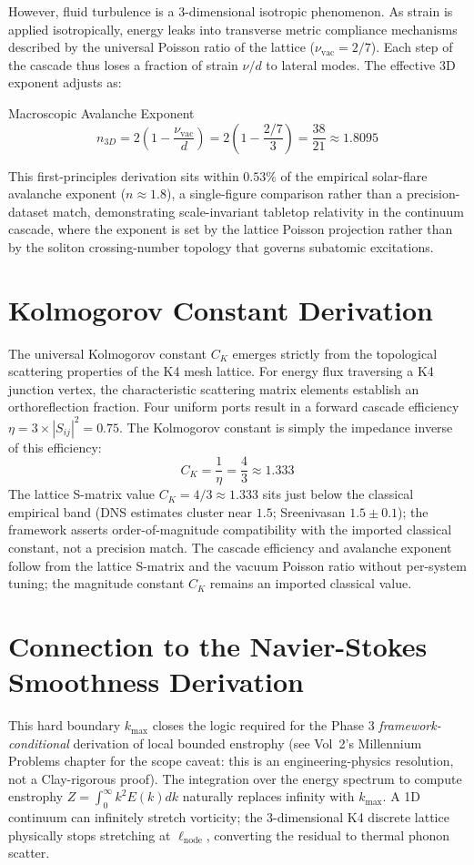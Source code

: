 However, fluid turbulence is a 3-dimensional isotropic phenomenon. As strain is applied isotropically, energy leaks into transverse metric compliance mechanisms described by the universal Poisson ratio of the lattice ($\nu_{\mathrm{vac}} = 2/7$). Each step of the cascade thus loses a fraction of strain $\nu/d$ to lateral modes. The effective 3D exponent adjusts as:
\begin{resultbox}{Macroscopic Avalanche Exponent}
\begin{equation}
    n_{3D} = 2 \left(1 - \frac{\nu_{\mathrm{vac}}}{d}\right) = 2\left(1 - \frac{2/7}{3}\right) = \frac{38}{21} \approx 1.8095
\end{equation}
\end{resultbox}
This first-principles derivation sits within $0.53\%$ of the empirical solar-flare avalanche exponent ($n \approx 1.8$), a single-figure comparison rather than a precision-dataset match, demonstrating scale-invariant tabletop relativity in the continuum cascade, where the exponent is set by the lattice Poisson projection rather than by the soliton crossing-number topology that governs subatomic excitations.

\section{Kolmogorov Constant Derivation}
The universal Kolmogorov constant $C_K$ emerges strictly from the topological scattering properties of the K4 mesh lattice. For energy flux traversing a K4 junction vertex, the characteristic scattering matrix elements establish an orthoreflection fraction. Four uniform ports result in a forward cascade efficiency $\eta = 3 \times |S_{ij}|^2 = 0.75$. The Kolmogorov constant is simply the impedance inverse of this efficiency:
\begin{equation}
    C_K = \frac{1}{\eta} = \frac{4}{3} \approx 1.333
\end{equation}
The lattice S-matrix value $C_K = 4/3 \approx 1.333$ sits just below the classical empirical band (DNS estimates cluster near $1.5$; Sreenivasan $1.5 \pm 0.1$); the framework asserts order-of-magnitude compatibility with the imported classical constant, not a precision match. The cascade efficiency and avalanche exponent follow from the lattice S-matrix and the vacuum Poisson ratio without per-system tuning; the magnitude constant $C_K$ remains an imported classical value.

\section{Connection to the Navier-Stokes Smoothness Derivation}
This hard boundary $k_{\max}$ closes the logic required for the Phase 3 \emph{framework-conditional} derivation of local bounded enstrophy (see Vol~2's Millennium Problems chapter for the scope caveat: this is an engineering-physics resolution, not a Clay-rigorous proof). The integration over the energy spectrum to compute enstrophy $Z = \int_0^\infty k^2 E(k) dk$ naturally replaces infinity with $k_{\max}$. A 1D continuum can infinitely stretch vorticity; the 3-dimensional K4 discrete lattice physically stops stretching at $\ell_{\mathrm{node}}$, converting the residual to thermal phonon scatter.
